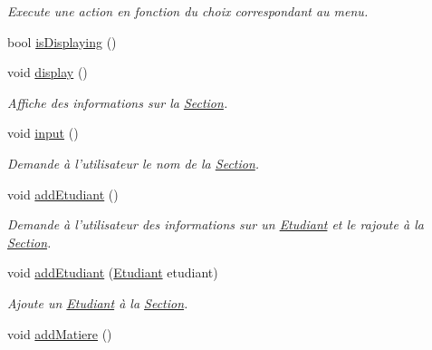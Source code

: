 \begin{DoxyCompactItemize}
\begin{DoxyCompactList}\small\item\em Execute une action en fonction du choix correspondant au menu. \end{DoxyCompactList}\item 
bool \hyperlink{class_section_a3e1d4d16a064d367f74c2f23a630dc7d}{is\-Displaying} ()
\item 
\hypertarget{class_section_a1f9ebccdb1937ca61a0d4adcde310832}{void \hyperlink{class_section_a1f9ebccdb1937ca61a0d4adcde310832}{display} ()}\label{class_section_a1f9ebccdb1937ca61a0d4adcde310832}

\begin{DoxyCompactList}\small\item\em Affiche des informations sur la \hyperlink{class_section}{Section}. \end{DoxyCompactList}\item 
\hypertarget{class_section_a32e3a0a0682f01437a82ddbf7dd59b0a}{void \hyperlink{class_section_a32e3a0a0682f01437a82ddbf7dd59b0a}{input} ()}\label{class_section_a32e3a0a0682f01437a82ddbf7dd59b0a}

\begin{DoxyCompactList}\small\item\em Demande à l'utilisateur le nom de la \hyperlink{class_section}{Section}. \end{DoxyCompactList}\item 
\hypertarget{class_section_a498f96acdfada6f355d1a35a591f4a07}{void \hyperlink{class_section_a498f96acdfada6f355d1a35a591f4a07}{add\-Etudiant} ()}\label{class_section_a498f96acdfada6f355d1a35a591f4a07}

\begin{DoxyCompactList}\small\item\em Demande à l'utilisateur des informations sur un \hyperlink{class_etudiant}{Etudiant} et le rajoute à la \hyperlink{class_section}{Section}. \end{DoxyCompactList}\item 
void \hyperlink{class_section_afd3afcbd3da0bf6f277cdb9a37822afd}{add\-Etudiant} (\hyperlink{class_etudiant}{Etudiant} etudiant)
\begin{DoxyCompactList}\small\item\em Ajoute un \hyperlink{class_etudiant}{Etudiant} à la \hyperlink{class_section}{Section}. \end{DoxyCompactList}\item 
\hypertarget{class_section_ad892af516bb83efba57fa8fbce5a0bde}{void \hyperlink{class_section_ad892af516bb83efba57fa8fbce5a0bde}{add\-Matiere} ()}\label{class_section_ad892af516bb83efba57fa8fbce5a0bde}


\end{DoxyCompactItemize}
